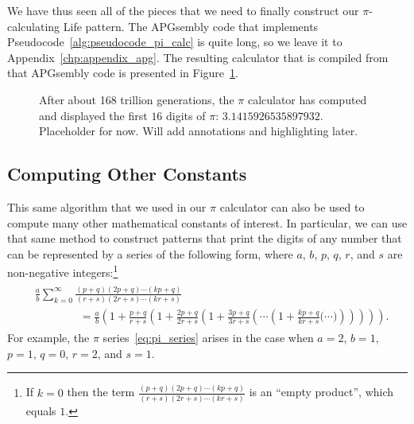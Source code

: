 We have thus seen all of the pieces that we need to finally construct our $\pi$-calculating Life pattern. The APGsembly code that implements Pseudocode~\ref{alg:pseudocode_pi_calc} is quite long, so we leave it to Appendix~\ref{chp:appendix_apg}. The resulting calculator that is compiled from that APGsembly code is presented in Figure~\ref{fig:pi_calc}.

\begin{figure}[!htbp]
	\centering{}
	
	\caption{After about 168 trillion generations, the $\pi$ calculator has computed and displayed the first $16$ digits of $\pi$: $3.1415926535897932$. Placeholder for now. Will add annotations and highlighting later.}\label{fig:pi_calc}
\end{figure}


\subsection{Computing Other Constants}\label{sec:pi_calc_other}

This same algorithm that we used in our $\pi$ calculator can also be used to compute many other mathematical constants of interest. In particular, we can use that same method to construct patterns that print the digits of any number that can be represented by a series of the following form, where $a$, $b$, $p$, $q$, $r$, and $s$ are non-negative integers:\footnote{If $k = 0$ then the term $\frac{(p+q)(2p+q)\cdots(kp+q)}{(r+s)(2r+s)\cdots(kr+s)}$ is an ``empty product'', which equals $1$.}
\begin{align}\begin{split}\label{eq:generalized_pi_series}
		& \frac{a}{b}\sum_{k=0}^\infty \frac{(p+q)(2p+q)\cdots(kp+q)}{(r+s)(2r+s)\cdots(kr+s)} \\
		& \qquad\qquad = \frac{a}{b}\left(1 + \frac{p+q}{r+s}\left( 1 + \frac{2p+q}{2r+s}\left( 1 + \frac{3p+q}{3r+s}\left( \cdots \left( 1 + \frac{kp+q}{kr+s}\Big( \cdots \Big) \right)\right)\right)\right)\right).
\end{split}\end{align}
For example, the $\pi$ series~\eqref{eq:pi_series} arises in the case when $a = 2$, $b = 1$, $p = 1$, $q = 0$, $r = 2$, and $s = 1$.


